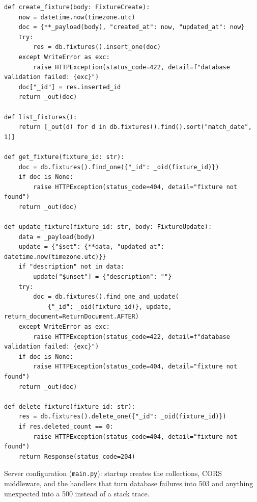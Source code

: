 \documentclass[11pt]{article}
\begin{document}
\begin{lstlisting}
def create_fixture(body: FixtureCreate):
    now = datetime.now(timezone.utc)
    doc = {**_payload(body), "created_at": now, "updated_at": now}
    try:
        res = db.fixtures().insert_one(doc)
    except WriteError as exc:
        raise HTTPException(status_code=422, detail=f"database validation failed: {exc}")
    doc["_id"] = res.inserted_id
    return _out(doc)

def list_fixtures():
    return [_out(d) for d in db.fixtures().find().sort("match_date", 1)]

def get_fixture(fixture_id: str):
    doc = db.fixtures().find_one({"_id": _oid(fixture_id)})
    if doc is None:
        raise HTTPException(status_code=404, detail="fixture not found")
    return _out(doc)

def update_fixture(fixture_id: str, body: FixtureUpdate):
    data = _payload(body)
    update = {"$set": {**data, "updated_at": datetime.now(timezone.utc)}}
    if "description" not in data:
        update["$unset"] = {"description": ""}
    try:
        doc = db.fixtures().find_one_and_update(
            {"_id": _oid(fixture_id)}, update, return_document=ReturnDocument.AFTER)
    except WriteError as exc:
        raise HTTPException(status_code=422, detail=f"database validation failed: {exc}")
    if doc is None:
        raise HTTPException(status_code=404, detail="fixture not found")
    return _out(doc)

def delete_fixture(fixture_id: str):
    res = db.fixtures().delete_one({"_id": _oid(fixture_id)})
    if res.deleted_count == 0:
        raise HTTPException(status_code=404, detail="fixture not found")
    return Response(status_code=204)
\end{lstlisting}
\endgroup
Server configuration (\verb|main.py|): startup creates the collections, CORS middleware, and the handlers that turn database failures into 503 and anything unexpected into a 500 instead of a stack trace.
\end{document}
